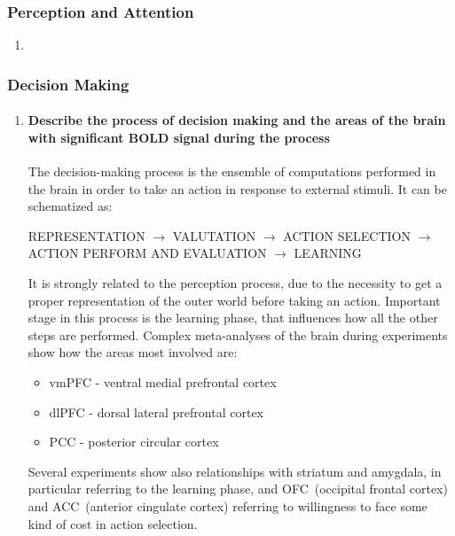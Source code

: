 \documentclass[12pt,article,oneside,a4paper]{memoir}
\begin{document}
\subsubsection{Perception and Attention}
\begin{enumerate}
\item 
\end{enumerate}

\subsubsection{Decision Making}
\begin{enumerate}
\item \paragraph{Describe the process of decision making and the areas of the
brain with significant BOLD signal during the process}

The decision-making process is the ensemble of computations performed in the
brain in order to take an action in response to external stimuli.
It can be schematized as:

REPRESENTATION $\rightarrow$ VALUTATION $\rightarrow$ ACTION SELECTION
$\rightarrow$ ACTION PERFORM AND EVALUATION $\rightarrow$ LEARNING

It is strongly related to the perception process, due to the necessity to get a
proper representation of the outer world before taking an action. Important
stage in this process is the learning phase, that influences how all the other
steps are performed. Complex meta-analyses of the brain during experiments show
how the areas most involved are:

\begin{itemize}
\item vmPFC - ventral medial prefrontal cortex
\item dlPFC - dorsal lateral prefrontal cortex
\item PCC - posterior circular cortex
\end{itemize}

Several experiments show also relationships with striatum and amygdala, in
particular referring to the learning phase, and OFC~(occipital frontal cortex)
and ACC~(anterior cingulate cortex) referring to willingness to face some kind
of cost in action selection.


\end{enumerate}
\end{document}
